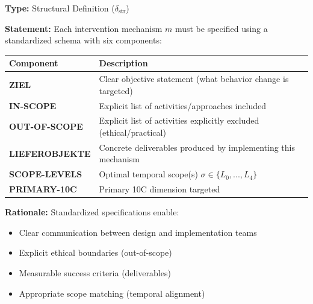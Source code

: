 \begin{tcolorbox}[colback=blue!5!white, colframe=blue!75!black,
    title=\textbf{Definition EIT-EMP-3-D4: Standardized Intervention Specification}]

\textbf{Type:} Structural Definition ($\delta_{\text{str}}$)

\textbf{Statement:} Each intervention mechanism $m$ must be specified using a standardized schema with six components:

\begin{center}
\begin{tabular}{lp{9cm}}
\toprule
\textbf{Component} & \textbf{Description} \\
\midrule
\textbf{ZIEL} & Clear objective statement (what behavior change is targeted) \\
\textbf{IN-SCOPE} & Explicit list of activities/approaches included \\
\textbf{OUT-OF-SCOPE} & Explicit list of activities explicitly excluded (ethical/practical) \\
\textbf{LIEFEROBJEKTE} & Concrete deliverables produced by implementing this mechanism \\
\textbf{SCOPE-LEVELS} & Optimal temporal scope(s) $\sigma \in \{L_0, ..., L_4\}$ \\
\textbf{PRIMARY-10C} & Primary 10C dimension targeted \\
\bottomrule
\end{tabular}
\end{center}

\textbf{Rationale:} Standardized specifications enable:
\begin{itemize}[nosep]
    \item Clear communication between design and implementation teams
    \item Explicit ethical boundaries (out-of-scope)
    \item Measurable success criteria (deliverables)
    \item Appropriate scope matching (temporal alignment)
\end{itemize}

\end{tcolorbox}

